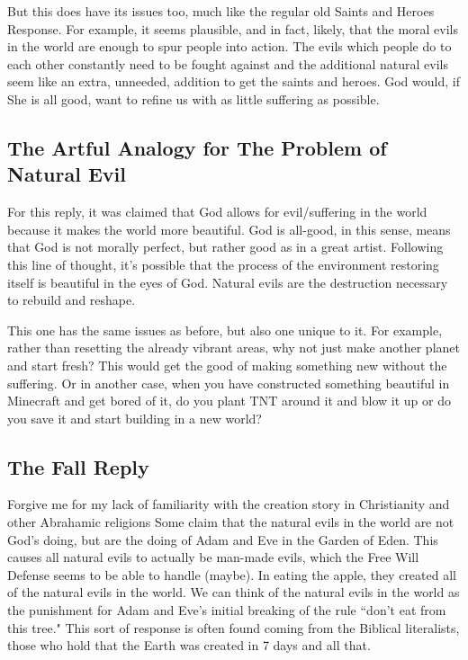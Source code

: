 But this does have its issues too, much like the regular old Saints and Heroes Response. For example, it seems plausible, and in fact, likely, that the moral evils in the world are enough to spur people into action. The evils which people do to each other constantly need to be fought against and the additional natural evils seem like an extra, unneeded, addition to get the saints and heroes. God would, if She is all good, want to refine us with as little suffering as possible. 
\subsection{The Artful Analogy for The Problem of Natural Evil} 

For this reply, it was claimed that God allows for evil/suffering in the world because it makes the world more beautiful. God is all-good, in this sense, means that God is not morally perfect, but rather good as in a great artist. Following this line of thought, it's possible that the process of the environment restoring itself is beautiful in the eyes of God. Natural evils are the destruction necessary to rebuild and reshape.

This one has the same issues as before, but also one unique to it. For example, rather than resetting the already vibrant areas, why not just make another planet and start fresh? This would get the good of making something new without the suffering. Or in another case, when you have constructed something beautiful in Minecraft and get bored of it, do you plant TNT around it and blow it up or do you save it and start building in a new world? 

\subsection{The Fall Reply}

Forgive me for my lack of familiarity with the creation story in Christianity and other Abrahamic religions Some claim that the natural evils in the world are not God’s doing, but are the doing of Adam and Eve in the Garden of Eden. This causes all natural evils to actually be man-made evils, which the Free Will Defense seems to be able to handle (maybe). In eating the apple, they created all of the natural evils in the world. We can think of the natural evils in the world as the punishment for Adam and Eve's initial breaking of the rule ``don't eat from this tree." This sort of response is often found coming from the Biblical literalists, those who hold that the Earth was created in 7 days and all that. 

